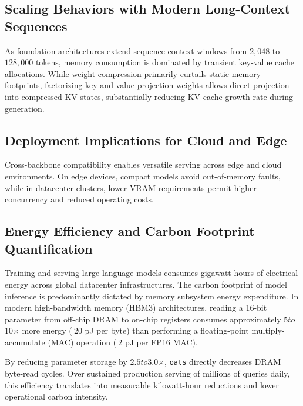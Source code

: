 \subsection{Scaling Behaviors with Modern Long-Context Sequences}
As foundation architectures extend sequence context windows from $2{,}048$ to $128{,}000$ tokens, memory consumption is dominated by transient key-value cache allocations. While weight compression primarily curtails static memory footprints, factorizing key and value projection weights allows direct projection into compressed KV states, substantially reducing KV-cache growth rate during generation.

\subsection{Deployment Implications for Cloud and Edge}
Cross-backbone compatibility enables versatile serving across edge and cloud environments. On edge devices, compact models avoid out-of-memory faults, while in datacenter clusters, lower VRAM requirements permit higher concurrency and reduced operating costs.

\subsection{Energy Efficiency and Carbon Footprint Quantification}
Training and serving large language models consumes gigawatt-hours of electrical energy across global datacenter infrastructures. The carbon footprint of model inference is predominantly dictated by memory subsystem energy expenditure. In modern high-bandwidth memory (HBM3) architectures, reading a 16-bit parameter from off-chip DRAM to on-chip registers consumes approximately $5$\times$ to $10$\times$ more energy ($~20$ pJ per byte) than performing a floating-point multiply-accumulate (MAC) operation ($~2$ pJ per FP16 MAC).

By reducing parameter storage by $2.5$\times$ to $3.0$\times$, \texttt{oats} directly decreases DRAM byte-read cycles. Over sustained production serving of millions of queries daily, this efficiency translates into measurable kilowatt-hour reductions and lower operational carbon intensity.
